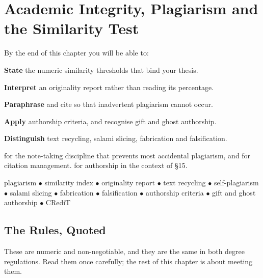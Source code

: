 \chapter{Academic Integrity, Plagiarism and the Similarity Test}\label{ch:integrity}

\begin{outcomes}
By the end of this chapter you will be able to:
\begin{tight}
  \item \textbf{State} the numeric similarity thresholds that bind your thesis.
  \item \textbf{Interpret} an originality report rather than reading its
    percentage.
  \item \textbf{Paraphrase} and cite so that inadvertent plagiarism cannot
    occur.
  \item \textbf{Apply} authorship criteria, and recognise gift and ghost
    authorship.
  \item \textbf{Distinguish} text recycling, salami slicing, fabrication and
    falsification.
\end{tight}
\end{outcomes}

\begin{prereq}
 for the note-taking discipline that prevents most accidental
plagiarism, and  for citation management.
 for authorship in the context of \S15.
\end{prereq}

\begin{keyterms}
plagiarism $\bullet$ similarity index $\bullet$ originality report $\bullet$
text recycling $\bullet$ self-plagiarism $\bullet$ salami slicing $\bullet$
fabrication $\bullet$ falsification $\bullet$ authorship criteria $\bullet$
gift and ghost authorship $\bullet$ CRediT
\end{keyterms}

\section{The Rules, Quoted}

These are numeric and non-negotiable, and they are the same in both degree
regulations. Read them once carefully; the rest of this chapter is about
meeting them.

